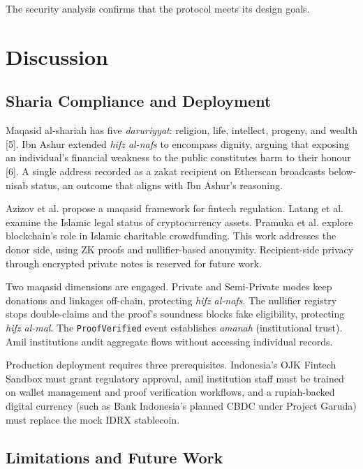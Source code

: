\documentclass[conference]{IEEEtran}
\begin{document}
The security analysis confirms that the protocol meets its design goals.

\section{Discussion}

\subsection{Sharia Compliance and Deployment}

Maqasid al-shariah has five \textit{daruriyyat}: religion, life, intellect, progeny, and wealth [5]. Ibn Ashur extended \textit{hifz al-nafs} to encompass dignity, arguing that exposing an individual's financial weakness to the public constitutes harm to their honour [6]. A single address recorded as a zakat recipient on Etherscan broadcasts below-nisab status, an outcome that aligns with Ibn Ashur's reasoning.

Azizov et al. \cite{b_maqasid_fintech} propose a maqasid framework for fintech regulation. Latang et al. \cite{b_fatwa_crypto} examine the Islamic legal status of cryptocurrency assets. Pramuka et al. \cite{b_icf_blockchain} explore blockchain's role in Islamic charitable crowdfunding. This work addresses the donor side, using ZK proofs and nullifier-based anonymity. Recipient-side privacy through encrypted private notes is reserved for future work.

Two maqasid dimensions are engaged. Private and Semi-Private modes keep donations and linkages off-chain, protecting \textit{hifz al-nafs}. The nullifier registry stops double-claims and the proof's soundness blocks fake eligibility, protecting \textit{hifz al-mal}. The \texttt{ProofVerified} event establishes \textit{amanah} (institutional trust). Amil institutions audit aggregate flows without accessing individual records.

Production deployment requires three prerequisites. Indonesia's OJK Fintech Sandbox must grant regulatory approval, amil institution staff must be trained on wallet management and proof verification workflows, and a rupiah-backed digital currency (such as Bank Indonesia's planned CBDC under Project Garuda) must replace the mock IDRX stablecoin.

\subsection{Limitations and Future Work}
\end{document}
